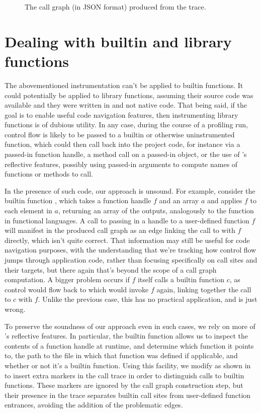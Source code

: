\begin{figure}[htbp]

\caption{The call graph (in JSON format) produced from the trace.}
\label{Fig:Callgraph}
\end{figure}

\section{Dealing with builtin and library functions}

The abovementioned instrumentation can't be applied to \matlab builtin
functions. It could potentially be applied to library functions, assuming their
source code was available and they were written in \matlab and not native code.
That being said, if the goal is to enable useful code navigation features, then
instrumenting library functions is of dubious utility. In any case, during the
course of a profiling run, control flow is likely to be passed to a builtin or
otherwise uninstrumented function, which could then call back into the project
code, for instance via a passed-in function handle, a method call on a
passed-in object, or the use of \matlab's reflective features, possibly using
passed-in arguments to compute names of functions or methods to call.

In the presence of such code, our approach is unsound. For example, consider
the builtin function , which takes a function handle $f$ and an
array $a$ and applies $f$ to each element in $a$, returning an array of the
outputs, analogously to the  function in functional languages. A call
to  passing in a handle to a user-defined function $f$ will
manifest in the produced call graph as an edge linking the call to
 with $f$ directly, which isn't quite correct. That information
may still be useful for code navigation purposes, with the understanding that
we're tracking how control flow jumps through application code, rather than
focusing specifically on call sites and their targets, but there again that's
beyond the scope of a call graph computation. A bigger problem occurs if $f$
itself calls a builtin function $c$, as control would flow back to
 which would invoke $f$ again, linking together the call to $c$
with $f$. Unlike the previous case, this has no practical application, and is
just wrong.

To preserve the soundness of our approach even in such cases, we rely on more
of \matlab's reflective features. In particular, the  builtin
function allows us to inspect the contents of a function handle at runtime, and
determine which function it points to, the path to the file in which that
function was defined if applicable, and whether or not it's a builtin function.
Using this facility, we modify  as
shown in  to insert extra markers in the call
trace in order to distinguish calls to builtin functions. These markers are
ignored by the call graph construction step, but their presence in the trace
separates builtin call sites from user-defined function entrances, avoiding
the addition of the problematic edges.

